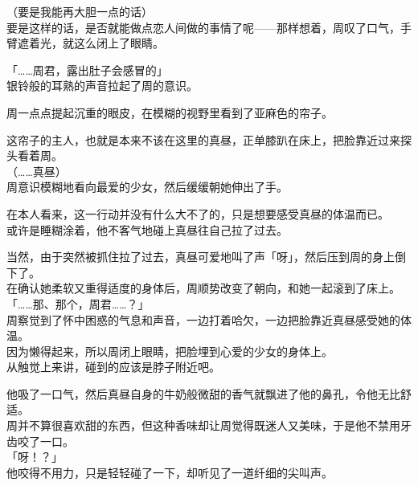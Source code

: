 （要是我能再大胆一点的话）\\

要是这样的话，是否就能做点恋人间做的事情了呢——那样想着，周叹了口气，手臂遮着光，就这么闭上了眼睛。\\

\vspace{2\baselineskip}

「……周君，露出肚子会感冒的」\\

银铃般的耳熟的声音拉起了周的意识。

周一点点提起沉重的眼皮，在模糊的视野里看到了亚麻色的帘子。

这帘子的主人，也就是本来不该在这里的真昼，正单膝趴在床上，把脸靠近过来探头看着周。\\

（……真昼）\\

周意识模糊地看向最爱的少女，然后缓缓朝她伸出了手。

在本人看来，这一行动并没有什么大不了的，只是想要感受真昼的体温而已。\\

或许是睡糊涂着，他不客气地碰上真昼往自己拉了过去。

当然，由于突然被抓住拉了过去，真昼可爱地叫了声「呀」，然后压到周的身上倒下了。\\

在确认她柔软又重得适度的身体后，周顺势改变了朝向，和她一起滚到了床上。\\

「……那、那个，周君……？」\\

周察觉到了怀中困惑的气息和声音，一边打着哈欠，一边把脸靠近真昼感受她的体温。\\

因为懒得起来，所以周闭上眼睛，把脸埋到心爱的少女的身体上。\\

从触觉上来讲，碰到的应该是脖子附近吧。

他吸了一口气，然后真昼自身的牛奶般微甜的香气就飘进了他的鼻孔，令他无比舒适。\\

周并不算很喜欢甜的东西，但这种香味却让周觉得既迷人又美味，于是他不禁用牙齿咬了一口。\\

「呀！？」\\

他咬得不用力，只是轻轻碰了一下，却听见了一道纤细的尖叫声。

